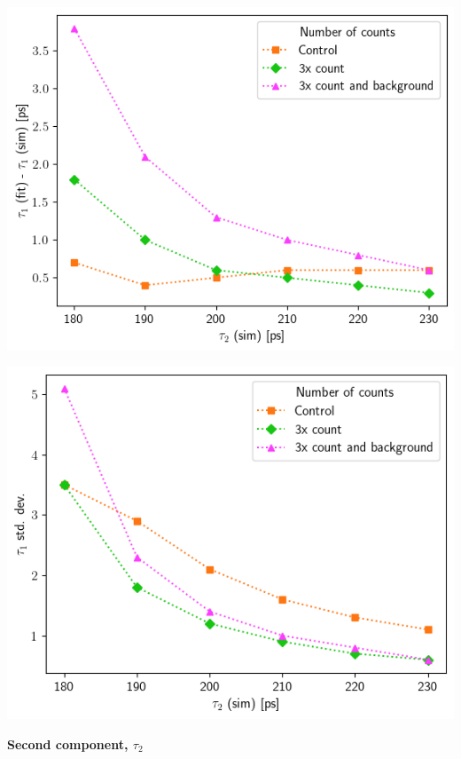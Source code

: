 {\begin{minipage}{.47\linewidth}
    \includegraphics[width=\linewidth]{Batch 5/t1-diff 8020.png}
    \label{fig:compcount-t1-8020}
\end{minipage}
\hfill
\begin{minipage}{.47\linewidth}
     
    \includegraphics[width=\linewidth]{Batch 5/t1-err 8020.png}
    \label{fig:compcount-t1err-8020}
\end{minipage}

\vfill
\textbf{Second component, $\tau_2$\unboldmath}

}
